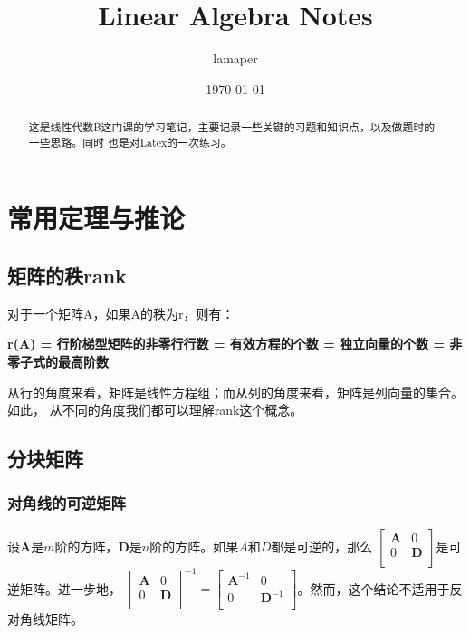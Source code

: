 \documentclass{ctexart}
\title{Linear Algebra Notes}
\author{lamaper}
\date{\today}
\begin{document}
    \maketitle

    \begin{abstract}
        这是线性代数B这门课的学习笔记，主要记录一些关键的习题和知识点，以及做题时的一些思路。同时
        也是对Latex的一次练习。
    \end{abstract}

    \section{常用定理与推论}
        \subsection{矩阵的秩rank}
        对于一个矩阵A，如果A的秩为r，则有：
        
        \textbf{\fangsong r(A) = 行阶梯型矩阵的非零行行数 = 有效方程的个数 = 独立向量的个数 = 非零子式的最高阶数}
        
        从行的角度来看，矩阵是线性方程组；而从列的角度来看，矩阵是列向量的集合。如此，
        从不同的角度我们都可以理解rank这个概念。
        \subsection{分块矩阵}
            \subsubsection{对角线的可逆矩阵}
            设$\mathbf{A}$是$m$阶的方阵，$\mathbf{D}$是$n$阶的方阵。如果$A$和$D$都是可逆的，那么
            $\begin{bmatrix}
                \mathbf{A} & 0 \\
                0 & \mathbf{D} \\
            \end{bmatrix}$是可逆矩阵。进一步地，
            $
            \begin{bmatrix}
                \mathbf{A} & 0 \\
                0 & \mathbf{D} \\
            \end{bmatrix}^{-1} = \begin{bmatrix}
                \mathbf{A}^{-1} & 0 \\
                0 & \mathbf{D}^{-1} \\
            \end{bmatrix}
            $。然而，这个结论不适用于反对角线矩阵。
\end{document}
